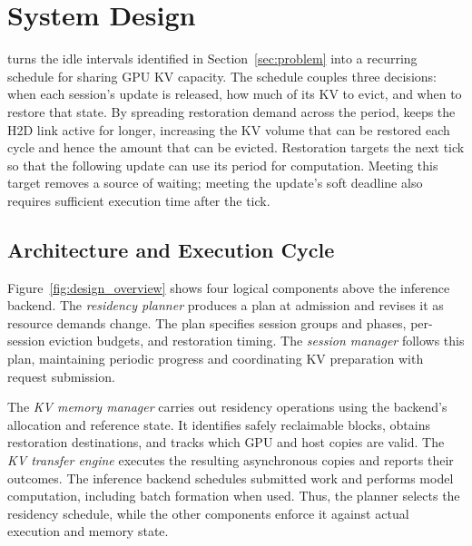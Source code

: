 \section{System Design}
\label{sec:design}

\systemname turns the idle intervals identified in Section~\ref{sec:problem} into a recurring schedule for sharing GPU KV capacity.
The schedule couples three decisions: when each session's update is released, how much of its KV to evict, and when to restore that state.
By spreading restoration demand across the period, \systemname keeps the H2D link active for longer, increasing the KV volume that can be restored each cycle and hence the amount that can be evicted.
Restoration targets the next tick so that the following update can use its period for computation.
Meeting this target removes a source of waiting; meeting the update's soft deadline also requires sufficient execution time after the tick.

\subsection{Architecture and Execution Cycle}
\label{sec:design-overview}

Figure~\ref{fig:design_overview} shows four logical components above the inference backend.
The \emph{residency planner} produces a plan at admission and revises it as resource demands change.
The plan specifies session groups and phases, per-session eviction budgets, and restoration timing.
The \emph{session manager} follows this plan, maintaining periodic progress and coordinating KV preparation with request submission.

The \emph{KV memory manager} carries out residency operations using the backend's allocation and reference state.
It identifies safely reclaimable blocks, obtains restoration destinations, and tracks which GPU and host copies are valid.
The \emph{KV transfer engine} executes the resulting asynchronous copies and reports their outcomes.
The inference backend schedules submitted work and performs model computation, including batch formation when used.
Thus, the planner selects the residency schedule, while the other components enforce it against actual execution and memory state.

